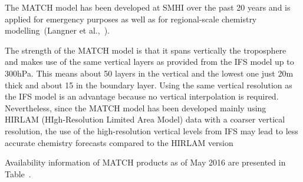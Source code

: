 \documentclass[9pt]{report}
\begin{document}
\noindent{}The MATCH model has been developed at SMHI over the past 20 years and is applied for emergency purposes as well as for regional-scale chemistry modelling~(Langner et al.,~).%

The strength of the MATCH model is that it spans vertically the troposphere and makes use of the same vertical layers as provided from the IFS model up to 300hPa. This means about 50 layers in the vertical and the lowest one just 20m thick and about 15 in the boundary layer.
Using the same vertical resolution as the IFS model is an advantage because no vertical interpolation is required.
Nevertheless, since the MATCH model has been developed mainly using HIRLAM (HIgh-Resolution Limited Area Model) data with a coarser vertical resolution, the use of the high-resolution vertical levels from IFS may lead to less accurate chemistry forecasts compared to the HIRLAM version%

Availability information of MATCH products as of May 2016 are presented in Table~.%
\end{document}
